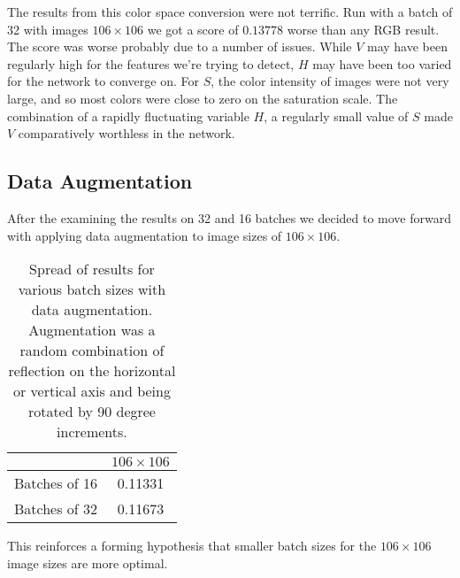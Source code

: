 The results from this color space conversion were not terrific. Run with a batch of 32 with images $106 \times 106$ we got a score of $0.13778$ worse than any RGB result. The score was worse probably due to a number of issues. While $V$ may have been regularly high for the features we're trying to detect, $H$ may have been too varied for the network to converge on. For $S$, the color intensity of images were not very large, and so most colors were close to zero on the saturation scale. The combination of a rapidly fluctuating variable $H$, a regularly small value of $S$ made $V$ comparatively worthless in the network.

\subsection{Data Augmentation}
After the examining the results on 32 and 16 batches we decided to move forward with applying data augmentation to image sizes of $106 \times 106$.

\begin{table}[]
    \centering
    \begin{tabular}{|r|c|}
        \hline
                      & $106 \times 106$ \\ \hline
        Batches of 16 &  0.11331 \\ \hline
        Batches of 32 &  0.11673 \\ \hline
    \end{tabular}
    \caption{Spread of results for various batch sizes with data augmentation. Augmentation was a random combination of reflection on the horizontal or vertical axis and being rotated by 90 degree increments. }
    \label{tab:results2}
\end{table}

This reinforces a forming hypothesis that smaller batch sizes for the $106 \times 106$ image sizes are more optimal.